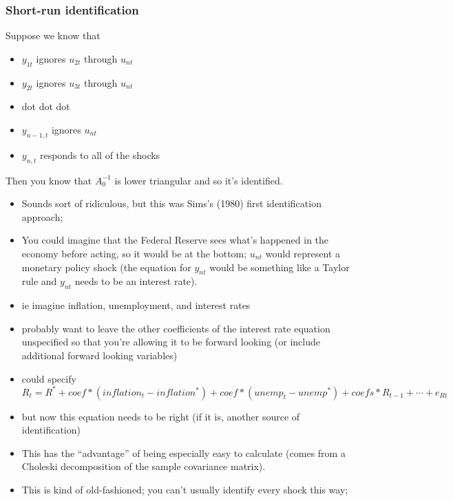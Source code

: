 \subsubsection{Short-run identification}

Suppose we know that
\begin{itemize}
\item $y_{1t}$ ignores $u_{2t}$ through $u_{nt}$
\item $y_{2t}$ ignores $u_{3t}$ through $u_{nt}$
\item dot dot dot
\item $y_{n-1,t}$ ignores $u_{nt}$
\item $y_{n,t}$ responds to all of the shocks
\end{itemize}
Then you know that $A_0^{-1}$ is lower triangular and so it's
identified.

\begin{itemize}
\item Sounds sort of ridiculous, but this was Sims's (1980) first
  identification approach;
\item You could imagine that the Federal Reserve sees what's happened
  in the economy before acting, so it would be at the bottom; $u_{nt}$
  would represent a monetary policy shock (the equation for $y_{nt}$
  would be something like a Taylor rule and $y_{nt}$ needs to be an
  interest rate).
\item ie imagine inflation, unemployment, and interest rates
\item probably want to leave the other coefficients of the interest
  rate equation unspecified so that you're allowing it to be forward
  looking (or include additional forward looking variables)
\item could specify
  \begin{equation*}
    R_t = R^* + coef * (inflation_t - inflation^*) + coef * (unemp_t - unemp^*) + coefs *
    R_{t-1} + \cdots + e_{Rt}
  \end{equation*}
\item but now this equation needs to be right (if it is, another
  source of identification)
\item This has the ``advantage'' of being especially easy to calculate
  (comes from a Choleski decomposition of the sample covariance
  matrix).
\item This is kind of old-fashioned; you can't usually identify every
  shock this way;
\end{itemize}

